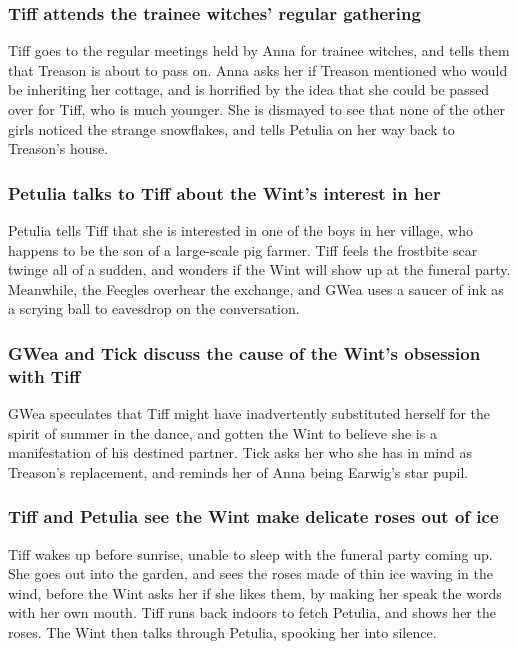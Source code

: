 \subsubsection{\Gls{Tiff} attends the trainee witches' regular gathering}
\Gls{Tiff} goes to the regular meetings held by \Gls{Anna} for trainee witches, and tells them
that \Gls{Treason} is about to pass on. \Gls{Anna} asks her if \Gls{Treason} mentioned who would be
inheriting her cottage, and is horrified by the idea that she could be passed over for \Gls{Tiff},
who is much younger. She is dismayed to see that none of the other girls noticed the strange
snowflakes, and tells \Gls{Petulia} on her way back to \Gls{Treason}'s house.

\subsubsection{\Gls{Petulia} talks to \Gls{Tiff} about the \Gls{Wint}'s interest in her}
\Gls{Petulia} tells \Gls{Tiff} that she is interested in one of the boys in her village, who happens
to be the son of a large-scale pig farmer. \Gls{Tiff} feels the frostbite scar twinge all of a
sudden, and wonders if the \Gls{Wint} will show up at the funeral party. Meanwhile, the Feegles
overhear the exchange, and \Gls{GWea} uses a saucer of ink as a scrying ball to eavesdrop on the
conversation.

\subsubsection{\Gls{GWea} and \Gls{Tick} discuss the cause of the \Gls{Wint}'s obsession with
    \Gls{Tiff}}
\Gls{GWea} speculates that \Gls{Tiff} might have inadvertently substituted herself for the spirit
of summer in the dance, and gotten the \Gls{Wint} to believe she is a manifestation of his
destined partner. \Gls{Tick} asks her who she has in mind as \Gls{Treason}'s replacement, and
reminds her of \Gls{Anna} being \Gls{Earwig}'s star pupil.

\subsubsection{\Gls{Tiff} and \Gls{Petulia} see the \Gls{Wint} make delicate roses out of ice}
\Gls{Tiff} wakes up before sunrise, unable to sleep with the funeral party coming up. She goes out
into the garden, and sees the roses made of thin ice waving in the wind, before the \Gls{Wint} asks
her if she likes them, by making her speak the words with her own mouth. \Gls{Tiff} runs back
indoors to fetch \Gls{Petulia}, and shows her the roses. The \Gls{Wint} then talks through
\Gls{Petulia}, spooking her into silence.

